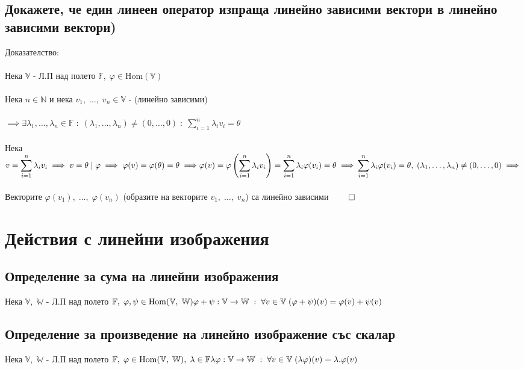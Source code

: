 \documentclass{article}
\newcommand{\V}{\mathbb{V}}
\newcommand{\N}{\mathbb{N}}
\newcommand{\F}{\mathbb{F}}
\newcommand{\W}{\mathbb{W}}
\newcommand{\n}[1]{#1_1, \dots, #1_n}
\newcommand{\OV}{\theta}
\begin{document}
    \subsection{Докажете, че един линеен оператор изпраща линейно зависими вектори в линейно зависими вектори)}
    Доказателство: \\\\
    Нека \(\V\) - Л.П над полето \(\F, \; \varphi \in \mathrm{Hom}(\V)\) \\\\
    Нека \(n \in \N\) и нека \(v_1, \; \dots, \; v_n \in \V\) - (линейно зависими) \\\\
    \(\implies \exists \n{\lambda} \in \F \; : \;  (\n{\lambda}) \neq (0, \dots, 0) \; : \; \displaystyle\sum_{i = 1}^n \lambda_i v_i = \OV\) \\\\
    Нека \(v = \displaystyle\sum_{i = 1}^n \lambda_i v_i \implies v = \OV \; | \;\varphi
    \implies \varphi(v) = \varphi(\OV) = \OV \implies \\\\
    \varphi(v) = \varphi\left(\displaystyle\sum_{i = 1}^n \lambda_i v_i\right) = \displaystyle\sum_{i = 1}^n \lambda_i \varphi(v_i) = \OV \implies \\\\
    \displaystyle\sum_{i = 1}^n \lambda_i \varphi(v_i) = \OV, \; (\n{\lambda}) \neq (0, \dots, 0) \implies \) \\\\
    Векторите \(\varphi(v_1), \; \dots, \; \varphi(v_n)\) (образите на векторите \(v_1, \; \dots, \; v_n\))
    са линейно зависими \(\qed\) 
    \section{Действия с линейни изображения}
    \subsection{Определение за сума на линейни изображения}
    Нека \(\V, \; \W\) - Л.П над полето \(\F, \; \varphi, \psi \in \mathrm{Hom}(\V, \; \W) \\\\
    \varphi + \psi : \V \to \W \; : \; \forall v \in \V \; (\varphi + \psi)(v) = \varphi(v) + \psi(v)\)
    \subsection{Определение за произведение на линейно изображение със скалар}
    Нека \(\V, \; \W\) - Л.П над полето \(\F, \; \varphi \in \mathrm{Hom}(\V, \; \W), \; \lambda \in \F \\\\
    \lambda\varphi : \V \to \W \; : \; \forall v \in \V \; (\lambda\varphi)(v) = \lambda.\varphi(v)\)
\end{document}
